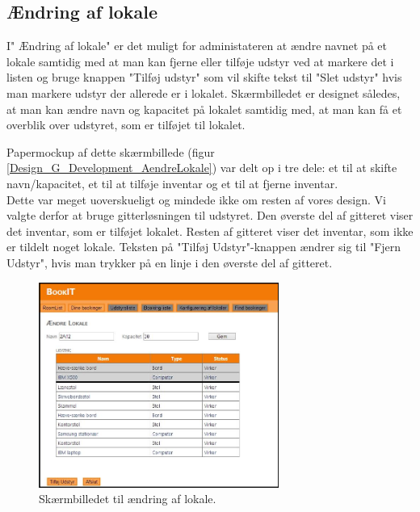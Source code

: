 \subsection{Ændring af lokale}
I" Ændring af lokale" er det muligt for administateren at ændre navnet på et lokale samtidig med at man kan fjerne eller tilføje udstyr ved at markere det i listen og bruge knappen "Tilføj udstyr" som vil skifte tekst til "Slet udstyr" hvis man markere udstyr der allerede er i lokalet.
Skærmbilledet er designet således, at man kan ændre navn og kapacitet på lokalet samtidig med, at man kan få et overblik over udstyret, som er tilføjet til lokalet.

Papermockup af dette skærmbillede (figur \ref{Design_G_Development_AendreLokale}) var delt op i tre dele: et til at skifte navn/kapacitet, et til at tilføje inventar og et til at fjerne inventar.
\\Dette var meget uoverskueligt og mindede ikke om resten af vores design. Vi valgte derfor at bruge gitterløsningen til udstyret. Den øverste del af gitteret viser det inventar, som er tilføjet lokalet. Resten af gitteret viser det inventar, som ikke er tildelt noget lokale. Teksten på "Tilføj Udstyr"-knappen ændrer sig til "Fjern Udstyr", hvis man trykker på en linje i den øverste del af gitteret.

\begin{figure}[h!]
  \centering
    \includegraphics[width=0.7\textwidth]{Appendix/GUI-Prototype/DigitalMockup/AendreLokale}
  \caption{Skærmbilledet til ændring af lokale.}
\label{Design_G_Development_AendreLokale_Final}
\end{figure} 

